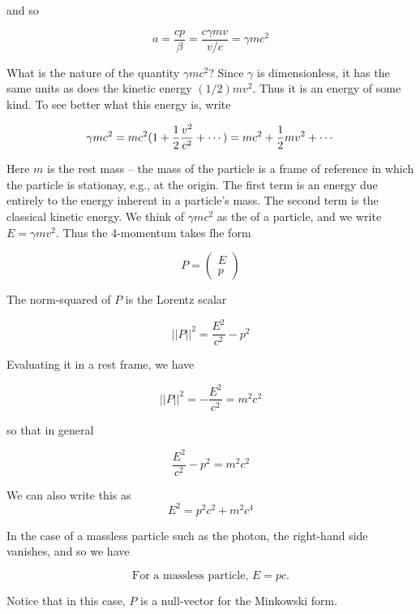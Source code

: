 and so

\begin{equation}
  a = \frac{cp}{\beta} = \frac{c\gamma mv}{v/c} = \gamma mc^2
\end{equation}

What is the nature of the quantity $\gamma mc^2$?
Since $\gamma$ is dimensionless, it has the same units
as does the kinetic energy $(1/2)mv^2$.  Thus it is an energy of
some kind. To see better what this energy is, write

\begin{equation}
\gamma m c^2
=  mc^2(1 + \small{\frac{1}{2}} \frac{v^2 }{ c^2} + \cdots)
= mc^2 + \small{\frac{1}{2}} mv^2 + \cdots
\end{equation}

Here $m$ is the rest mass -- the mass of the particle is a frame
of reference in which the particle is stationay, e.g., at the origin.
The first term is an energy due entirely to the energy inherent
in a particle's mass. The second term is the classical kinetic energy.
We think of $\gamma mc^2$ as the  of a particle,
and we write $E = \gamma mv^2$.  Thus the 4-momentum
takes fhe form

\begin{equation}
  P = \begin{pmatrix}E \\ p \end{pmatrix}
\end{equation}



The norm-squared of $P$ is the Lorentz scalar

\begin{equation}
  ||P||^2 = \frac{E^2 }{ c^2} - p^2
\end{equation}

Evaluating it in a rest frame, we have

\begin{equation}
  ||P||^2 = - \frac{E^2 }{ c^2}  = m^2 c^2
\end{equation}

so that in general

\begin{equation}
  \frac{E^2 }{ c^2} - p^2  = m^2 c^2
\end{equation}

We can also write this as
\begin{equation}
\label{relativistic_energy_momentum_equation}
E^2 = p^2 c^2 + m^2 c^4
\end{equation}

In the case of a massless particle such as the photon,
the right-hand side vanishes, and so we have

\begin{equation}
\label{energy_momentum_proportionality}
\text{For a massless particle,  }
 E = pc.
\end{equation}

Notice that in this case, $P$ is a null-vector for the Minkowski form.
